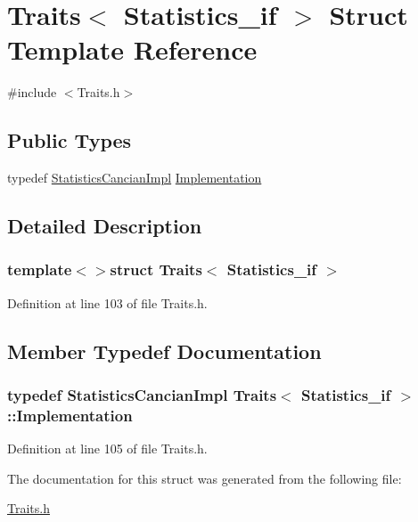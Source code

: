 \hypertarget{struct_traits_3_01_statistics__if_01_4}{\section{Traits$<$ Statistics\-\_\-if $>$ Struct Template Reference}
\label{struct_traits_3_01_statistics__if_01_4}
}


{\ttfamily \#include $<$Traits.\-h$>$}

\subsection*{Public Types}
\begin{DoxyCompactItemize}
\item 
typedef \hyperlink{class_statistics_cancian_impl}{Statistics\-Cancian\-Impl} \hyperlink{struct_traits_3_01_statistics__if_01_4_a96b3a1f9dc72c141d92f389c86907228}{Implementation}
\end{DoxyCompactItemize}


\subsection{Detailed Description}
\subsubsection*{template$<$$>$struct Traits$<$ Statistics\-\_\-if $>$}



Definition at line 103 of file Traits.\-h.



\subsection{Member Typedef Documentation}
\hypertarget{struct_traits_3_01_statistics__if_01_4_a96b3a1f9dc72c141d92f389c86907228}{
\subsubsection[{Implementation}]{\setlength{\rightskip}{0pt plus 5cm}typedef {\bf Statistics\-Cancian\-Impl} {\bf Traits}$<$ {\bf Statistics\-\_\-if} $>$\-::{\bf Implementation}}}\label{struct_traits_3_01_statistics__if_01_4_a96b3a1f9dc72c141d92f389c86907228}


Definition at line 105 of file Traits.\-h.



The documentation for this struct was generated from the following file\-:\begin{DoxyCompactItemize}
\item 
\hyperlink{_traits_8h}{Traits.\-h}\end{DoxyCompactItemize}
